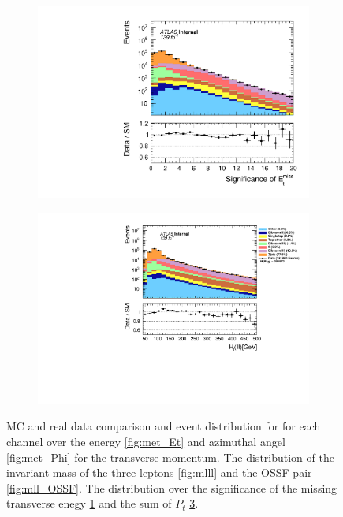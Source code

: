 \begin{figure}[H]
{\begin{subfigure}{.405\textwidth}
        \includegraphics[width=\textwidth]{Figures/FeaturesHistograms/MCvsData/met_Sign.pdf}
        \caption{}
        \label{fig:met_Sign}
    \end{subfigure}
    \hfill
    \begin{subfigure}{.525\textwidth}
        \includegraphics[width=\textwidth]{Figures/FeaturesHistograms/MCvsData/Ht_lll.pdf}
        \caption{}
        \label{fig:Ht_lll}
    \end{subfigure}
    }
    \caption{\ac{MC} and real data comparison and event distribution for for each channel over the energy \ref{fig:met_Et} and azimuthal
    angel \ref{fig:met_Phi} for the transverse momentum. The distribution of the invariant mass of the
    three leptons \ref{fig:mlll} and the OSSF pair \ref{fig:mll_OSSF}. The distribution over the significance
    of the missing transverse enegy \ref{fig:met_Sign} and the sum of $P_t$ \ref{fig:Ht_lll}.}
\end{figure}
